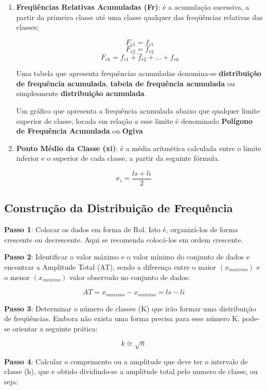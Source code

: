 \begin{enumerate}
\item \textbf{Freqüências Relativas Acumuladas (Fr)}: é a acumulação sucessiva, a partir da primeira classe até uma classe qualquer das freqüências relativas das classes;

    $$ F_{r1}=f_{r1} $$
    $$ F_{r2}=f_{r2} $$
    $$   \ldots  $$
    $$ F_{rk}=f_{r1}+f_{r2}+\ldots+ f_{rk}$$

Uma tabela que apresenta frequências acumuladas denomina-se \textbf{distribuição de frequência acumulada}, \textbf{tabela de frequência acumulada} ou simplesmente \textbf{distribuição acumulada}.\vskip0.3cm

Um gráfico que apresenta a frequência acumulada abaixo que qualquer limite superior de classe, locada em relação a esse limite é denominado \textbf{Polígono de Frequência Acumulada} ou \textbf{Ogiva}




    \item \textbf{Ponto Médio da Classe (xi)}: é a média aritmética calculada entre o limite inferior e o superior de cada classe, a partir da seguinte fórmula.
\end{enumerate}


$$ x_{i}=\frac{ls+li}{2} $$


\subsection{Construção da Distribuição de Frequência}

\inic \textbf{Passo 1}: Colocar os dados em forma de Rol. Isto é, organizá-los de forma crescente ou decrescente. Aqui se recomenda colocá-los em ordem crescente.\vskip0.3cm

\textbf{Passo 2}: Identificar o valor máximo e o valor mínimo do conjunto de dados e encontrar a Amplitude Total (AT), sendo a diferença entre o maior $(x_{maximo})$ e o menor $(x_{minimo})$  valor observado no conjunto de dados:

$$ AT= x_{maximo}- x_{minimo} = ls - li$$

\textbf{Passo 3}: Determinar o número de classes (K) que irão formar uma distribuição de freqüências. Embora não exista uma forma precisa para esse número K, pode-se orientar a seguinte prática:


$$ k \cong \sqrt{n}$$


\textbf{Passo 4}: Calcular o comprimento ou a amplitude que deve ter o intervalo de classe (h), que e obtido dividindo-se a amplitude total pelo numero de classe, ou seja:


